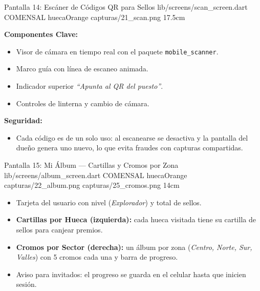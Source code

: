 \pantallashowcase
  {Pantalla 14: Escáner de Códigos QR para Sellos}
  {lib/screens/scan\_screen.dart}
  {COMENSAL}
  {huecaOrange}
  {capturas/21_scan.png}
  {17.5cm}
  {

    \textbf{Componentes Clave:}
    \begin{itemize}[leftmargin=*, itemsep=2pt]
      \item Visor de cámara en tiempo real con el paquete \texttt{mobile\_scanner}.
      \item Marco guía con línea de escaneo animada.
      \item Indicador superior \textit{``Apunta al QR del puesto''}.
      \item Controles de linterna y cambio de cámara.
    \end{itemize}
    \vspace{0.2cm}

    \textbf{Seguridad:}
    \begin{itemize}[leftmargin=*, itemsep=2pt]
      \item Cada código es de un solo uso: al escanearse se desactiva y la pantalla del dueño genera uno nuevo, lo que evita fraudes con capturas compartidas.
    \end{itemize}
  }

\pantalladoble
  {Pantalla 15: Mi Álbum --- Cartillas y Cromos por Zona}
  {lib/screens/album\_screen.dart}
  {COMENSAL}
  {huecaOrange}
  {capturas/22_album.png}
  {capturas/25_cromos.png}
  {14cm}
  {
    \begin{itemize}[leftmargin=*, itemsep=2pt]
      \item Tarjeta del usuario con nivel (\textit{Explorador}) y total de sellos.
      \item \textbf{Cartillas por Hueca (izquierda):} cada hueca visitada tiene su cartilla de sellos para canjear premios.
      \item \textbf{Cromos por Sector (derecha):} un álbum por zona (\textit{Centro, Norte, Sur, Valles}) con 5 cromos cada una y barra de progreso.
      \item Aviso para invitados: el progreso se guarda en el celular hasta que inicien sesión.
    \end{itemize}
  }

